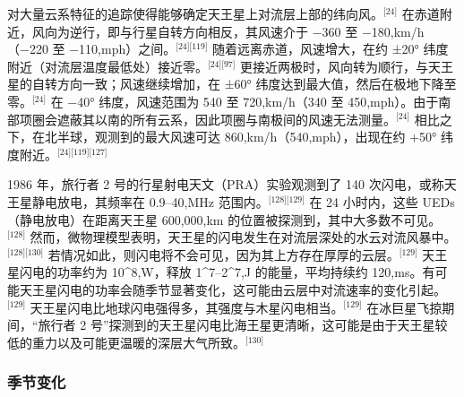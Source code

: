 对大量云系特征的追踪使得能够确定天王星上对流层上部的纬向风。$^{\text{[24]}}$ 在赤道附近，风向为逆行，即与行星自转方向相反，其风速介于 −360 至 −180,km/h（−220 至 −110,mph）之间。$^{\text{[24][119]}}$ 随着远离赤道，风速增大，在约 ±20° 纬度附近（对流层温度最低处）接近零。$^{\text{[24][97]}}$ 更接近两极时，风向转为顺行，与天王星的自转方向一致；风速继续增加，在 ±60° 纬度达到最大值，然后在极地下降至零。$^{\text{[24]}}$ 在 −40° 纬度，风速范围为 540 至 720,km/h（340 至 450,mph）。由于南部项圈会遮蔽其以南的所有云系，因此项圈与南极间的风速无法测量。$^{\text{[24]}}$ 相比之下，在北半球，观测到的最大风速可达 860,km/h（540,mph），出现在约 +50° 纬度附近。$^{\text{[24][119][127]}}$

1986 年，旅行者 2 号的行星射电天文（PRA）实验观测到了 140 次闪电，或称天王星静电放电，其频率在 0.9–40,MHz 范围内。$^{\text{[128][129]}}$ 在 24 小时内，这些 UEDs（静电放电）在距离天王星 600,000,km 的位置被探测到，其中大多数不可见。$^{\text{[128]}}$ 然而，微物理模型表明，天王星的闪电发生在对流层深处的水云对流风暴中。$^{\text{[128][130]}}$ 若情况如此，则闪电将不会可见，因为其上方存在厚厚的云层。$^{\text{[129]}}$ 天王星闪电的功率约为 10^8,W，释放 1^7–2^7,J 的能量，平均持续约 120,ms。有可能天王星闪电的功率会随季节显著变化，这可能由云层中对流速率的变化引起。$^{\text{[129]}}$ 天王星闪电比地球闪电强得多，其强度与木星闪电相当。$^{\text{[129]}}$ 在冰巨星飞掠期间，“旅行者 2 号”探测到的天王星闪电比海王星更清晰，这可能是由于天王星较低的重力以及可能更温暖的深层大气所致。$^{\text{[130]}}$
\subsubsection{季节变化}

